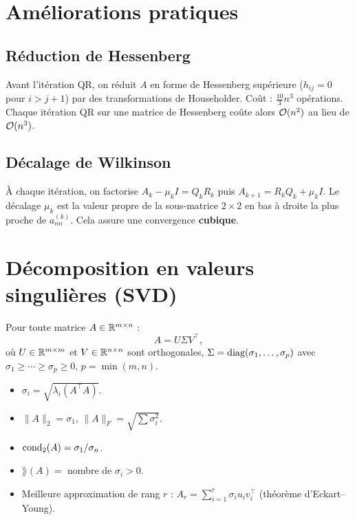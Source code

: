 \section{Am\'eliorations pratiques}

\subsection{R\'eduction de Hessenberg}

\begin{definition}
Avant l'it\'eration QR, on r\'eduit $A$ en forme de Hessenberg sup\'erieure ($h_{ij}=0$ pour $i>j+1$) par des transformations de Householder. Co\^ut : $\frac{10}{3}n^3$ op\'erations. Chaque it\'eration QR sur une matrice de Hessenberg co\^ute alors $\mathcal{O}(n^2)$ au lieu de $\mathcal{O}(n^3)$.
\end{definition}

\subsection{D\'ecalage de Wilkinson}

\begin{definition}
\`A chaque it\'eration, on factorise $A_k-\mu_k I=Q_kR_k$ puis $A_{k+1}=R_kQ_k+\mu_k I$. Le d\'ecalage $\mu_k$ est la valeur propre de la sous-matrice $2\times 2$ en bas \`a droite la plus proche de $a_{nn}^{(k)}$. Cela assure une convergence \textbf{cubique}.
\end{definition}

\section{D\'ecomposition en valeurs singuli\`eres (SVD)}

\begin{definition}
Pour toute matrice $A\in\mathbb{R}^{m\times n}$ :
\[
A = U\Sigma V^\top,
\]
o\`u $U\in\mathbb{R}^{m\times m}$ et $V\in\mathbb{R}^{n\times n}$ sont orthogonales, $\Sigma=\operatorname{diag}(\sigma_1,\ldots,\sigma_p)$ avec $\sigma_1\geq\cdots\geq\sigma_p\geq 0$, $p=\min(m,n)$.
\end{definition}

\begin{theoreme}
\begin{itemize}
\item $\sigma_i=\sqrt{\lambda_i(A^\top A)}$.
\item $\|A\|_2=\sigma_1$, $\|A\|_F=\sqrt{\sum\sigma_i^2}$.
\item $\mathrm{cond}_2(A)=\sigma_1/\sigma_n$.
\item $\rang(A)=$ nombre de $\sigma_i>0$.
\item Meilleure approximation de rang $r$ : $A_r=\sum_{i=1}^r\sigma_i u_i v_i^\top$ (th\'eor\`eme d'Eckart--Young).
\end{itemize}
\end{theoreme}

